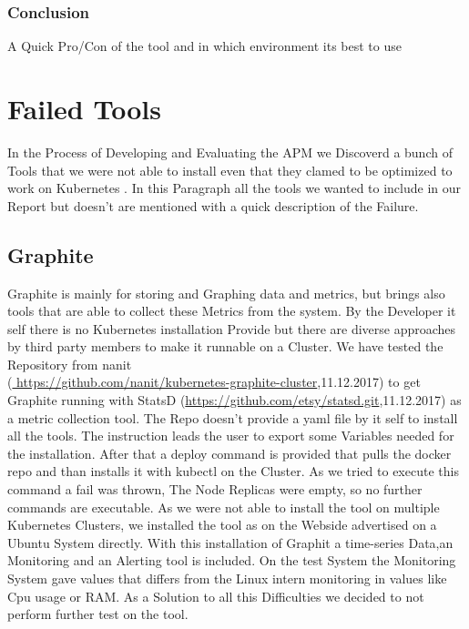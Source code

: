 \subsubsection{Conclusion}
A Quick Pro/Con of the tool and in which environment its best to use

\section{Failed Tools}%
In the Process of Developing and Evaluating the APM we Discoverd a bunch of Tools that we were not able to install even that they clamed to be optimized to work on Kubernetes .
In this Paragraph all the tools we wanted to include in our Report but doesn't are mentioned with a quick description of the Failure.
\subsection{Graphite}
Graphite is mainly for storing and Graphing data and metrics, but brings also tools that are able to collect these Metrics from the system. By the Developer it self there is no Kubernetes installation Provide but there are diverse approaches by third party members to make it runnable on a Cluster. We have tested the Repository from nanit\\(\url{ https://github.com/nanit/kubernetes-graphite-cluster},11.12.2017) to get Graphite running with StatsD (\url{https://github.com/etsy/statsd.git},11.12.2017) as a metric collection tool. The Repo doesn't provide a yaml file by it self to install all the tools. The instruction leads the user to export some Variables needed for the installation. After that a deploy command is provided that pulls the docker repo and than installs it with kubectl on the Cluster. As we tried to execute this command a fail was thrown, The Node Replicas were empty, so no further commands are executable. As we were not able to install the tool on multiple Kubernetes Clusters, we installed the tool as on the Webside advertised on a Ubuntu System directly. With this installation of Graphit a time-series Data,an Monitoring and an Alerting tool is included. On the test System the Monitoring System gave values that differs from the Linux intern monitoring in values like Cpu usage or RAM. As a Solution to all this Difficulties we decided to not perform further test on the tool.

